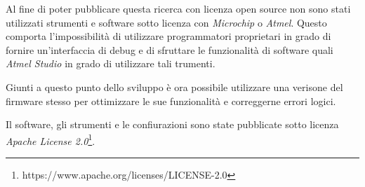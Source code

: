 Al fine di poter pubblicare questa ricerca con licenza open source non sono stati utilizzati strumenti e software sotto licenza con \textit{Microchip} o \textit{Atmel}. Questo comporta l'impossibilità di utilizzare programmatori proprietari in grado di fornire un'interfaccia di debug e di sfruttare le funzionalità di software quali \textit{Atmel Studio} in grado di utilizzare tali trumenti.

Giunti a questo punto dello sviluppo è ora possibile utilizzare una verisone del firmware stesso per ottimizzare le sue funzionalità e correggerne errori logici.

Il software, gli strumenti e le confiurazioni sono state pubblicate sotto licenza \textit{Apache License 2.0}\footnote{https://www.apache.org/licenses/LICENSE-2.0}.